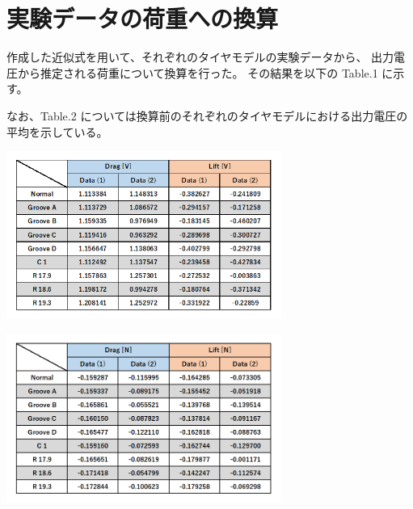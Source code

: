 \documentclass[twocolumn,a4j]{jsarticle}
\begin{document}
\section{実験データの荷重への換算}
作成した近似式を用いて、それぞれのタイヤモデルの実験データから、
出力電圧から推定される荷重について換算を行った。
その結果を以下の Table.1 に示す。\par
なお、Table.2 については換算前のそれぞれのタイヤモデルにおける出力電圧の平均を示している。
\begin{table}[htbp]
    \footnotesize
    \begin{center}
        \caption{}
        \includegraphics[width=90mm]{images/Table_1.png}
        \caption{}
        \includegraphics[width=90mm]{images/Table_2.png}
    \end{center}
\end{table}
\end{document}
